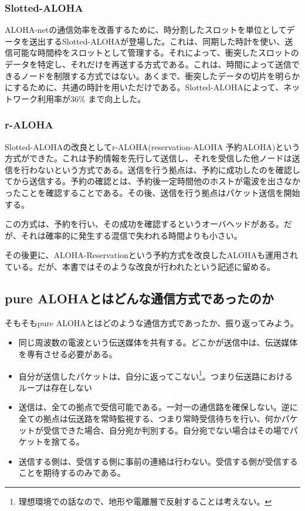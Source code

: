 \subsubsection{Slotted-ALOHA}

ALOHA-netの通信効率を改善するために、時分割したスロットを単位としてデータを送出するSlotted-ALOHAが登場した。これは、同期した時計を使い、送信可能な時間枠をスロットとして管理する。それによって、衝突したスロットのデータを特定し、それだけを再送する方式である。これは、時間によって送信できるノードを制限する方式ではない。あくまで、衝突したデータの切片を明らかにするために、共通の時計を用いただけである。Slotted-ALOHAによって、ネットワーク利用率が36\% まで向上した。

\subsubsection{r-ALOHA}

Slotted-ALOHAの改良としてr-ALOHA(reservation-ALOHA 予約ALOHA)という方式ができた。これは予約情報を先行して送信し、それを受信した他ノードは送信を行わないという方式である。送信を行う拠点は、予約に成功したのを確認してから送信する。予約の確認とは、予約後一定時間他のホストが電波を出さなかったことを確認することである。その後、送信を行う拠点はパケット送信を開始する。

この方式は、予約を行い、その成功を確認するというオーバヘッドがある。だが、それは確率的に発生する混信で失われる時間よりも小さい。

その後更に、ALOHA-Reservationという予約方式を改良したALOHAも運用されている。だが、本書ではそのような改良が行われたという記述に留める。

\subsection{pure ALOHAとはどんな通信方式であったのか}

そもそもpure ALOHAとはどのような通信方式であったか、振り返ってみよう。

\begin{itemize}
\item 同じ周波数の電波という伝送媒体を共有する。どこかが送信中は、伝送媒体を専有させる必要がある。
\item 自分が送信したパケットは、自分に返ってこない\footnote{理想環境での話なので、地形や電離層で反射することは考えない。}。つまり伝送路におけるループは存在しない
\item 送信は、全ての拠点で受信可能である。一対一の通信路を確保しない。逆に全ての拠点は伝送路を常時監視する、つまり常時受信待ちを行い、何かパケットが受信できた場合、自分宛か判別する。自分宛でない場合はその場でパケットを捨てる。
\item 送信する側は、受信する側に事前の連絡は行わない。受信する側が受信することを期待するのみである。
\end{itemize}


